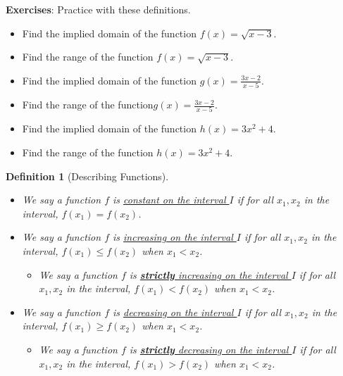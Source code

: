 \documentclass{article}
\theoremstyle{plain}
\theoremstyle{box}
\newtheorem*{definition*}{Definition}
\begin{document}
\textbf{Exercises}: Practice with these definitions.
\begin{itemize}
\item Find the implied domain of the function $f(x) = \sqrt{x-3}$.
\item Find the range of the function $f(x) = \sqrt{x-3}$.
\item Find the implied domain of the function $g(x) = \frac{3x-2}{x-5}$.
\item Find the range of the function$g(x) = \frac{3x-2}{x-5}$.
\item Find the implied domain of the function $h(x) = 3x^2 +4$.
\item Find the range of the function $h(x) = 3x^2 +4$.
\end{itemize}
\vspace{0.1in}

\newpage
\begin{definition*}[Describing Functions]\hfill
\begin{itemize}
\item We say a function $f$ is \underline{constant on the interval $I$} if for all $x_1, x_2$ in the interval, $f(x_1)=f(x_2)$.
\item We say a function $f$ is \underline{increasing on the interval $I$} if for all $x_1, x_2$ in the interval, $f(x_1) \leq f(x_2)$ when $x_1 < x_2$.
\begin{itemize}
\item We say a function $f$ is \underline{\textbf{strictly} increasing on the interval $I$} if for all $x_1, x_2$ in the interval, $f(x_1) < f(x_2)$ when $x_1 < x_2$.
\end{itemize}
\item We say a function $f$ is \underline{decreasing on the interval $I$} if for all $x_1, x_2$ in the interval, $f(x_1) \geq f(x_2)$ when $x_1 < x_2$.
\begin{itemize}
\item We say a function $f$ is \underline{\textbf{strictly} decreasing on the interval $I$} if for all $x_1, x_2$ in the interval, $f(x_1) > f(x_2)$ when $x_1 < x_2$.
\end{itemize}
\end{itemize}
\end{definition*}
\vspace{0.15in}
\end{document}
